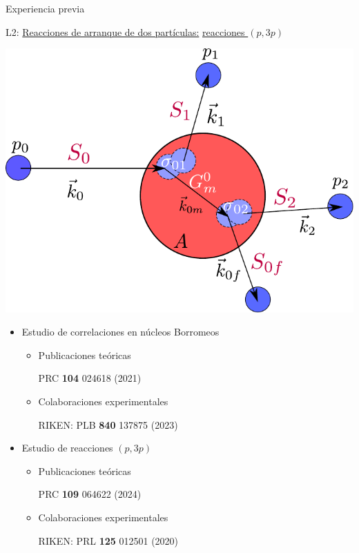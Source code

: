 \documentclass{beamer}
\begin{document}
\begin{frame}{Experiencia previa} 

   \begin{minipage}{0.45\textwidth}
     \tiny L2: \underline{Reacciones de arranque de dos partículas:} \underline{reacciones $(p, 3p)$} 
    
    \includegraphics[height=0.3\textheight]{model.pdf}
    
    \end{minipage}
    \begin{minipage}{0.45\textwidth}
    \tiny
    \begin{itemize}
    \item Estudio de correlaciones en núcleos Borromeos
    \begin{itemize}
       \tiny
    \item Publicaciones teóricas
    
    PRC \textbf{104} 024618 (2021)
    
    \item Colaboraciones experimentales
    
    RIKEN: PLB \textbf{840} 137875 (2023)
    
    \end{itemize}
    \item Estudio de reacciones $(p,3p)$
    \begin{itemize}
    \tiny
    \item Publicaciones teóricas
    
    PRC \textbf{109} 064622 (2024)
    
    \item Colaboraciones experimentales
    
     RIKEN: PRL \textbf{125} 012501 (2020)   
    
    \end{itemize}
    \end{itemize}
    \end{minipage}
    
\end{frame}
\end{document}

